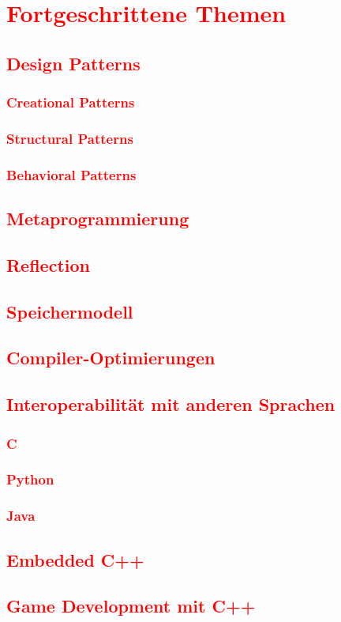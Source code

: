 \cleardoublepage\chapter{\textcolor{red}{Fortgeschrittene Themen}}\label{chap:advanced-topics}
\section{\textcolor{red}{Design Patterns}}\label{sec:design-patterns}
\subsection{\textcolor{red}{Creational Patterns}}\label{sec:creational-patterns}
\subsection{\textcolor{red}{Structural Patterns}}\label{sec:structural-patterns}
\subsection{\textcolor{red}{Behavioral Patterns}}\label{sec:behavioral-patterns}
\section{\textcolor{red}{Metaprogrammierung}}\label{sec:metaprogramming}
\section{\textcolor{red}{Reflection}}\label{sec:reflection}
\section{\textcolor{red}{Speichermodell}}\label{sec:memory-model}
\section{\textcolor{red}{Compiler-Optimierungen}}\label{sec:compiler-optimizations}
\section{\textcolor{red}{Interoperabilität mit anderen Sprachen}}\label{sec:interoperability}
\subsection{\textcolor{red}{C}}\label{sec:interop-c}
\subsection{\textcolor{red}{Python}}\label{sec:interop-python}
\subsection{\textcolor{red}{Java}}\label{sec:interop-java}
\section{\textcolor{red}{Embedded C++}}\label{sec:embedded-cpp}
\section{\textcolor{red}{Game Development mit C++}}\label{sec:game-development}
